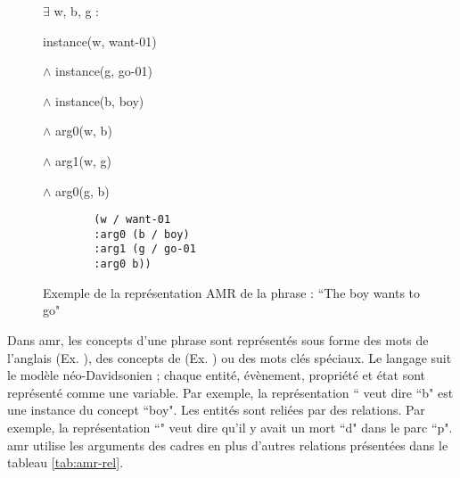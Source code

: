 \documentclass{KodeBook}
\begin{document}
\begin{figure}[ht]
	\centering
	\begin{minipage}{.3\textwidth}
		
		\footnotesize
		$ \exists $ w, b, g : 
		
		instance(w, want-01) 
		
		$ \wedge $ instance(g, go-01) 
		
		$ \wedge $ instance(b, boy) 
		
		$ \wedge $ arg0(w, b) 
		
		$ \wedge $ arg1(w, g) 
		
		$ \wedge $ arg0(g, b)
	\end{minipage}
	\begin{minipage}{.35\textwidth}
		
		\begin{verbatim}
		(w / want-01
		:arg0 (b / boy)
		:arg1 (g / go-01
		:arg0 b))
		\end{verbatim}
		
	\end{minipage}
	\begin{minipage}{.3\textwidth}
		
	\end{minipage}
	\caption[Exemple d'une représentation AMR]{Exemple de la représentation AMR de la phrase : ``The boy wants to go"}
	\label{fig:amr-exp}
\end{figure}

Dans \ac{amr}, les concepts d'une phrase sont représentés sous forme des mots de l'anglais (Ex. ), des concepts de  (Ex. ) ou des mots clés spéciaux. 
Le langage suit le modèle néo-Davidsonien ; chaque entité, évènement, propriété et état sont représenté comme une variable. 
Par exemple, la représentation ``  veut dire ``b" est une instance du concept ``boy".
Les entités sont reliées par des relations.
Par exemple, la représentation ``" veut dire qu'il y avait un mort ``d" dans le parc ``p".
\ac{amr} utilise les arguments des cadres  en plus d'autres relations présentées dans le tableau \ref{tab:amr-rel}.
\end{document}
